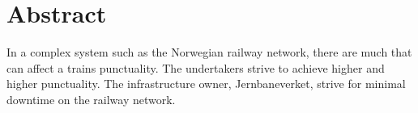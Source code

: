 \section*{Abstract}

In a complex system such as the Norwegian railway network, there are much that
can affect a trains punctuality. The undertakers strive to achieve higher and
higher punctuality. The infrastructure owner, Jernbaneverket, strive for
minimal downtime on the railway network.

\clearpage
